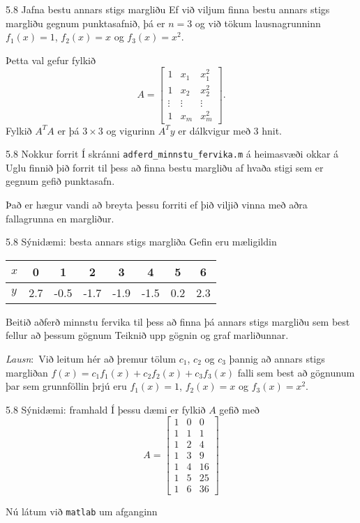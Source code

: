 \begin{frame}{5.8 Jafna bestu annars stigs margliðu}
Ef við viljum finna bestu annars stigs margliðu gegnum punktasafnið,
þá er  
$n=3$ og við tökum lausnagrunninn $f_1(x)=1$, $f_2(x)=x$  og 
$f_3(x)=x^2$.  

\pause
\smallskip
Þetta val gefur fylkið
\begin{equation*}
	A = \left[\begin{matrix} 
		1& x_1 & x_1^2\\
		1& x_2 & x_2^2\\
		\vdots &\vdots &\vdots\\
		1& x_m& x_m^2 
	\end{matrix}\right].
\end{equation*}
Fylkið $A^TA$ er þá $3\times 3$ og vigurinn $A^Ty$ er dálkvigur með
$3$ hnit.  
\end{frame}

\begin{frame}{5.8 Nokkur forrit} 
Í skránni {\tt adferd\_minnstu\_fervika.m}
á heimasvæði okkar á Uglu finnið þið forrit til þess að finna bestu
margliðu af hvaða stigi sem er gegnum gefið punktasafn.   

\pause
\smallskip
Það er hægur vandi að breyta þessu forriti ef þið viljið vinna með
aðra fallagrunna en margliður.
\end{frame}

\begin{frame}{5.8 Sýnidæmi:   besta annars stigs margliða} 
Gefin eru mæligildin 

\begin{center}
\begin{tabular}{l|ccccccc}
$x$ & 0& 1 & 2 & 3 & 4 & 5 & 6\\ \hline
$y$ & 2.7 & -0.5  & -1.7 &-1.9 & -1.5 & 0.2 &2.3 
\end{tabular}
\end{center}
Beitið aðferð minnstu fervika til þess að finna 
þá annars stigs margliðu sem best fellur að þessum gögnum
Teiknið upp gögnin og graf marliðunnar.

\pause
\bigskip
{\it Lausn}:\  Við leitum hér að þremur tölum $c_1$, $c_2$ og 
$c_3$ þannig að annars stigs margliðan
$f(x)=c_1f_1(x)+c_2f_2(x)+c_3f_3(x)$  falli sem best að gögnunum
þar sem grunnföllin þrjú eru
$f_1(x)=1$, $f_2(x)=x$ og $f_3(x)=x^2$.
\end{frame}

\begin{frame}{5.8 Sýnidæmi: framhald}
Í þessu dæmi er fylkið $A$ gefið með
$$
A=\left[\begin{matrix}
1 & 0&0\\
1 & 1&1\\
1&2&4\\
1&3&9\\
1&4&16\\
1&5&25\\
1&6&36
\end{matrix}\right]
$$

Nú látum við {\tt matlab} um afganginn
\end{frame}

